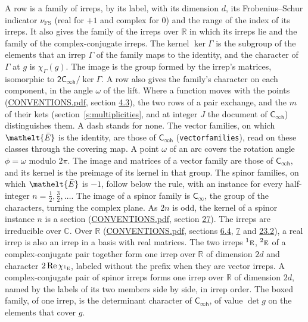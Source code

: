 \documentclass[10pt,a4paper]{article}
\numberwithin{equation}{section}
\newcommand{\eltfont}[1]{{\let\sigma\eltsigma\mathelt{#1}}}
\newcommand{\grp}[1]{\mathsf{#1}}
\newcommand{\irr}[1]{\text{\normalfont\scshape #1}}
\newcommand{\conjpair}[1]{{}^{#1}}
\newcommand{\elt}[1]{\eltfont{#1}}
\newcommand{\irchar}[1]{\chi_{#1}}
\newcommand{\fsind}{\nu_{\mathrm{FS}}}
\newcommand{\barred}[1]{\bar{#1}}
\begin{document}
\leavevmode\label{n:head.family.irreps}\label{n:index.dimension}\label{n:index.frobenius}\label{n:head.index.family}A row is a family of irreps, by its label, with its dimension $d$, its Frobenius--Schur indicator $\fsind$ (real for $+1$ and complex for $0$) and the range of the index of its irreps. \label{n:head.conjugate}\label{n:head.over.real}It also gives the family of the irreps over $\mathbb{R}$ in which its irreps lie and the family of the complex-conjugate irreps. \label{n:head.kernel}\label{n:function.character}The kernel $\ker\Gamma$ is the subgroup of the elements that an irrep $\Gamma$ of the family maps to the identity, and the character of $\Gamma$ at $g$ is $\irchar{\Gamma}(g)$. \label{n:head.image}The image is the group formed by the irrep's matrices, isomorphic to $\grp{2C_{\infty h}}/\ker\Gamma$. A row also gives the family's character on each component, in the angle $\omega$ of the lift. Where a function moves with the points (\href{../../CONVENTIONS.pdf}{CONVENTIONS.pdf}, section \href{../../../rotation/CONVENTIONS.pdf\#conv.4.3}{4.3}), the two rows of a pair exchange, and the $m$ of their kets (section~\ref{s:multiplicities}, and at integer $J$ the document of \href{../../../rotation/data/pdf/Cinfh.pdf}{$\grp{C_{\infty h}}$}) distinguishes them. A dash stands for none. The vector families, on which $\elt{\barred{E}}$ is the identity, are those of \href{../../../rotation/data/pdf/Cinfh.pdf}{$\grp{C_{\infty h}}$} (\texttt{vectorfamilies}), read on these classes through the covering map. A point $\omega$ of an arc covers the rotation angle $\phi = \omega$ modulo $2\pi$. The image and matrices of a vector family are those of \href{../../../rotation/data/pdf/Cinfh.pdf}{$\grp{C_{\infty h}}$}, and its kernel is the preimage of its kernel in that group. The spinor families, on which $\elt{\barred{E}}$ is $-1$, follow below the rule, with an instance for every half-integer $n = \tfrac{1}{2}, \tfrac{3}{2}, \dots$. The image of a spinor family is \href{../../../rotation/data/pdf/Cinf.pdf}{$\grp{C_{\infty}}$}, the group of the characters, turning the complex plane. As $2n$ is odd, the kernel of a spinor instance $n$ is a section (\href{../../CONVENTIONS.pdf}{CONVENTIONS.pdf}, section \href{../../CONVENTIONS.pdf\#conv.27}{27}). The irreps are irreducible over $\mathbb{C}$. Over $\mathbb{R}$ (\href{../../CONVENTIONS.pdf}{CONVENTIONS.pdf}, sections \href{../../../rotation/CONVENTIONS.pdf\#conv.6.4}{6.4}, \href{../../../rotation/CONVENTIONS.pdf\#conv.7}{7} and \href{../../CONVENTIONS.pdf\#conv.23.2}{23.2}), a real irrep is also an irrep in a basis with real matrices. The two irreps $\conjpair{1}\irr{e}$, $\conjpair{2}\irr{e}$ of a complex-conjugate pair together form one irrep over $\mathbb{R}$ of dimension $2d$ and character $2\operatorname{Re}\irchar{\conjpair{1}\irr{e}}$, labeled without the prefix when they are vector irreps. A complex-conjugate pair of spinor irreps forms one irrep over $\mathbb{R}$ of dimension $2d$, named by the labels of its two members side by side, in irrep order. \label{n:mark.determinant}The boxed family, of one irrep, is the determinant character of \href{../../../rotation/data/pdf/Cinfh.pdf}{$\grp{C_{\infty h}}$}, of value $\det g$ on the elements that cover $g$.
\end{document}
